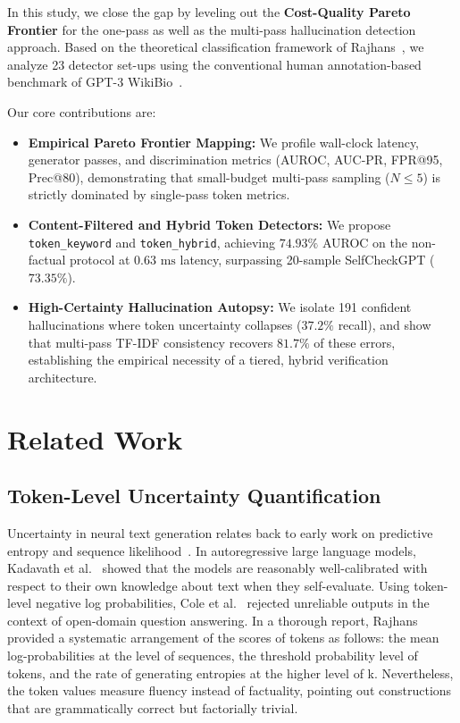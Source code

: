 \documentclass[conference]{IEEEtran}
\begin{document}
In this study, we close the gap by leveling out the \textbf{Cost-Quality Pareto Frontier} for the one-pass as well as the multi-pass hallucination detection approach. Based on the theoretical classification framework of Rajhans~\cite{rajhans2025token}, we analyze 23 detector set-ups using the conventional human annotation-based benchmark of GPT-3 WikiBio~\cite{manakul2023selfcheckgpt}. 

Our core contributions are:
\begin{itemize}
    \item \textbf{Empirical Pareto Frontier Mapping:} We profile wall-clock latency, generator passes, and discrimination metrics (AUROC, AUC-PR, FPR@95, Prec@80), demonstrating that small-budget multi-pass sampling ($N \le 5$) is strictly dominated by single-pass token metrics.
    \item \textbf{Content-Filtered and Hybrid Token Detectors:} We propose \texttt{token\_keyword} and \texttt{token\_hybrid}, achieving $\mathbf{74.93\%}$ AUROC on the non-factual protocol at $0.63\text{ ms}$ latency, surpassing 20-sample SelfCheckGPT ($73.35\%$).
    \item \textbf{High-Certainty Hallucination Autopsy:} We isolate 191 confident hallucinations where token uncertainty collapses ($37.2\%$ recall), and show that multi-pass TF-IDF consistency recovers $\mathbf{81.7\%}$ of these errors, establishing the empirical necessity of a tiered, hybrid verification architecture.
\end{itemize}

\section{Related Work}
\subsection{Token-Level Uncertainty Quantification}
Uncertainty in neural text generation relates back to early work on predictive entropy and sequence likelihood~\cite{malinin2021predictive}. In autoregressive large language models, Kadavath et al.~\cite{kadavath2022language}  showed that the models are reasonably well-calibrated with respect to their own knowledge about text when they self-evaluate. Using token-level negative log probabilities, Cole et al.~\cite{cole2023selectively} rejected unreliable outputs in the context of open-domain question answering. In a thorough report, Rajhans~\cite{rajhans2025token} provided a systematic arrangement of the scores of tokens as follows: the mean log-probabilities at the level of sequences, the threshold probability level of tokens, and the rate of generating entropies at the higher level of k. Nevertheless, the token values measure fluency instead of factuality, pointing out constructions that are grammatically correct but factorially trivial.
\end{document}
